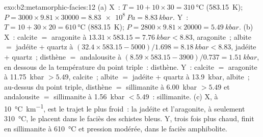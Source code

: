 \begin{solution}{exo:b2:metamorphic-facies:12}
(a) X~: $T = 10 + 10\times30 = \qty{310}{\celsius}$ (\qty{583.15}{K}); $P = 3000\times
9.81\times30000 = \qty{8.83e8}{Pa} = \qty{8.83}{kbar}$. Y~: $T = 10 + 30\times20 =
\qty{610}{\celsius}$ (\qty{883.15}{K}); $P = 2800\times9.81\times20000 = \qty{5.49}{kbar}$.
(b) X~: calcite $=$ aragonite à $13.31\times583.15 = \qty{7.76}{kbar} < 8.83$, aragonite~;
albite $=$ jadéite + quartz à $(32.4\times583.15 - 5000)/1.698 = \qty{8.18}{kbar} <
8.83$, jadéite + quartz~; disthène $=$ andalousite à $(8.59\times583.15 - 3900)/0.737 =
\qty{1.51}{kbar}$, en dessous de la température du point triple~: disthène. Y~: calcite $=$
aragonite à \qty{11.75}{kbar} $> 5.49$, calcite~; albite $=$ jadéite + quartz à
\qty{13.9}{kbar}, albite~; au-dessus du point triple, disthène $=$ sillimanite à
\qty{6.00}{kbar} $> 5.49$ et andalousite $=$ sillimanite à \qty{1.56}{kbar} $< 5.49$~:
sillimanite. (c) X, à \qty{10}{\celsius\per\km}, est le trajet le plus froid~: la jadéite et
l'aragonite, à seulement \qty{310}{\celsius}, le placent dans le faciès des schistes bleus. Y, trois fois
plus chaud, finit en sillimanite à \qty{610}{\celsius} et pression modérée, dans le faciès
amphibolite.
\end{solution}

